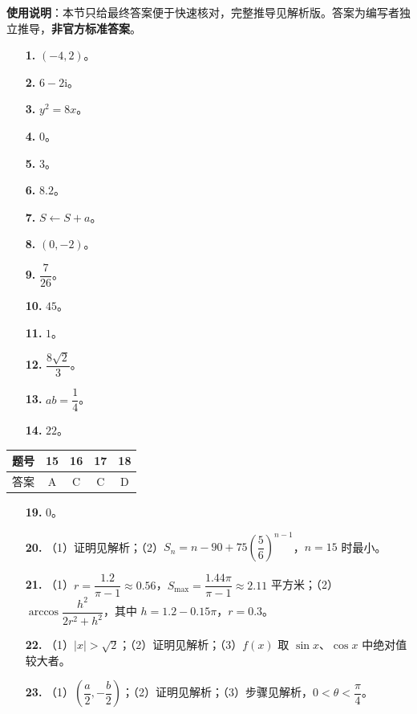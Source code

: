 
\begin{gknotice}
\textbf{使用说明}：本节只给最终答案便于快速核对，完整推导见解析版。答案为编写者独立推导，\textbf{非官方标准答案}。
\end{gknotice}

\begin{itemize}[leftmargin=2.6em]
  \item[\textbf{1.}] $(-4,2)$。
  \item[\textbf{2.}] $6-2\mathrm i$。
  \item[\textbf{3.}] $y^2=8x$。
  \item[\textbf{4.}] $0$。
  \item[\textbf{5.}] $3$。
  \item[\textbf{6.}] $8.2$。
  \item[\textbf{7.}] $S\leftarrow S+a$。
  \item[\textbf{8.}] $(0,-2)$。
  \item[\textbf{9.}] $\dfrac7{26}$。
  \item[\textbf{10.}] $45$。
  \item[\textbf{11.}] $1$。
  \item[\textbf{12.}] $\dfrac{8\sqrt2}3$。
  \item[\textbf{13.}] $ab=\dfrac14$。
  \item[\textbf{14.}] $22$。
\end{itemize}

\begin{center}\begin{tabular}{ccccc}
\toprule
题号 & 15 & 16 & 17 & 18 \\
\midrule
答案 & A & C & C & D \\
\bottomrule
\end{tabular}\end{center}

\begin{itemize}[leftmargin=2.6em]
  \item[\textbf{19.}] $0$。
  \item[\textbf{20.}] （1）证明见解析；（2）$S_n=n-90+75\left(\dfrac56\right)^{n-1}$，$n=15$ 时最小。
  \item[\textbf{21.}] （1）$r=\dfrac{1.2}{\pi-1}\approx0.56$，$S_{\max}=\dfrac{1.44\pi}{\pi-1}\approx2.11$ 平方米；（2）$\arccos\dfrac{h^2}{2r^2+h^2}$，其中 $h=1.2-0.15\pi$，$r=0.3$。
  \item[\textbf{22.}] （1）$\lvert x\rvert>\sqrt2$；（2）证明见解析；（3）$f(x)$ 取 $\sin x$、$\cos x$ 中绝对值较大者。
  \item[\textbf{23.}] （1）$\left(\dfrac a2,-\dfrac b2\right)$；（2）证明见解析；（3）步骤见解析，$0<\theta<\dfrac\pi4$。
\end{itemize}

